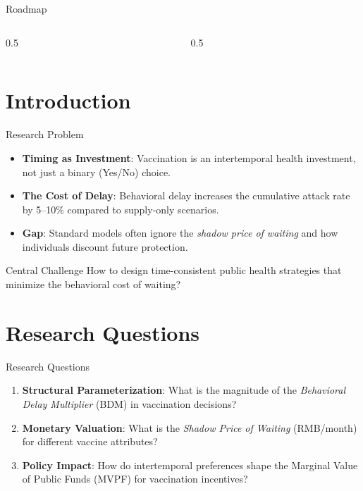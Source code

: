 \documentclass[10pt, aspectratio=169, xcolor={svgnames}]{beamer}
\begin{document}
\begin{frame}{Roadmap}
    \begin{columns}[t]
        \begin{column}{0.5\textwidth}
            \tableofcontents[sections={1-3}]
        \end{column}
        \begin{column}{0.5\textwidth}
            \tableofcontents[sections={4-6}]
        \end{column}
    \end{columns}
\end{frame}

\section{Introduction}

\begin{frame}{Research Problem}
    \begin{itemize}
        \item \textbf{Timing as Investment}: Vaccination is an intertemporal health investment, not just a binary (Yes/No) choice.
        \item \textbf{The Cost of Delay}: Behavioral delay increases the cumulative attack rate by 5--10\% compared to supply-only scenarios.
        \item \textbf{Gap}: Standard models often ignore the \textit{shadow price of waiting} and how individuals discount future protection.
    \end{itemize}
    
    \begin{block}{Central Challenge}
        How to design time-consistent public health strategies that minimize the behavioral cost of waiting?
    \end{block}
\end{frame}

\section{Research Questions}

\begin{frame}{Research Questions}
    \begin{enumerate}
        \item \textbf{Structural Parameterization}: What is the magnitude of the \textit{Behavioral Delay Multiplier} (BDM) in vaccination decisions?
        \item \textbf{Monetary Valuation}: What is the \textit{Shadow Price of Waiting} (RMB/month) for different vaccine attributes?
        \item \textbf{Policy Impact}: How do intertemporal preferences shape the Marginal Value of Public Funds (MVPF) for vaccination incentives?
    \end{enumerate}
\end{frame}
\end{document}
